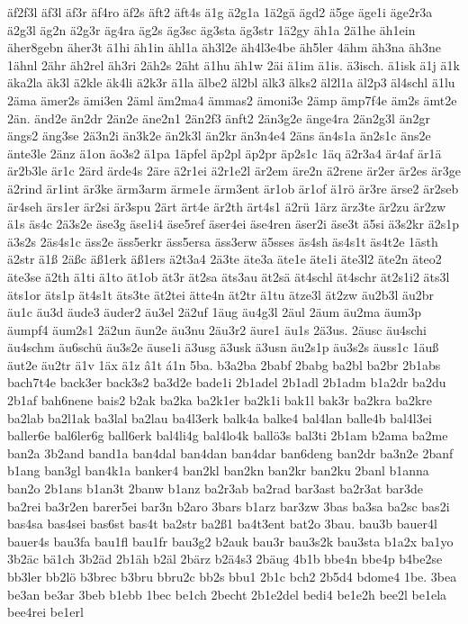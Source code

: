 {äf2f3l
äf3l
äf3r
äf4ro
äf2s
äft2
äft4s
ä1g
ä2g1a
1ä2gä
ägd2
ä5ge
äge1i
äge2r3a
ä2g3l
äg2n
ä2g3r
äg4ra
äg2s
äg3sc
äg3sta
äg3str
1ä2gy
äh1a
2ä1he
äh1ein
äher8gebn
äher3t
ä1hi
äh1in
ähl1a
äh3l2e
äh4l3e4be
äh5ler
4ähm
äh3na
äh3ne
1ähnl
2ähr
äh2rel
äh3ri
2äh2s
2äht
ä1hu
äh1w
2äi
ä1im
ä1is.
ä3isch.
ä1isk
ä1j
ä1k
äka2la
äk3l
ä2kle
äk4li
ä2k3r
ä1la
älbe2
äl2bl
älk3
älks2
äl2l1a
äl2p3
äl4schl
ä1lu
2äma
ämer2s
ämi3en
2äml
äm2ma4
ämmas2
ämoni3e
2ämp
ämp7f4e
äm2s
ämt2e
2än.
änd2e
än2dr
2än2e
äne2n1
2än2f3
änft2
2än3g2e
änge4ra
2än2g3l
än2gr
ängs2
äng3se
2ä3n2i
än3k2e
än2k3l
än2kr
än3n4e4
2äns
än4s1a
än2s1c
äns2e
änte3le
2änz
ä1on
äo3s2
ä1pa
1äpfel
äp2pl
äp2pr
äp2s1c
1äq
ä2r3a4
är4af
är1ä
är2b3le
är1c
2ärd
ärde4s
2äre
ä2r1ei
ä2r1e2l
är2em
äre2n
ä2rene
är2er
är2es
är3ge
ä2rind
är1int
är3ke
ärm3arm
ärme1e
ärm3ent
är1ob
är1of
ä1rö
är3re
ärse2
är2seb
är4seh
ärs1er
är2si
är3spu
2ärt
ärt4e
är2th
ärt4s1
ä2rü
1ärz
ärz3te
är2zu
är2zw
ä1s
äs4c
2ä3s2e
äse3g
äse1i4
äse5ref
äser4ei
äse4ren
äser2i
äse3t
ä5si
ä3s2kr
ä2s1p
ä3s2s
2äs4s1c
äss2e
äss5erkr
äss5ersa
äss3erw
ä5sses
äs4sh
äs4s1t
äs4t2e
1ästh
ä2str
ä1ß
2äßc
äß1erk
äß1ers
ä2t3a4
2ä3te
äte3a
äte1e
äte1i
äte3l2
äte2n
äteo2
äte3se
ä2th
ä1ti
ä1to
ät1ob
ät3r
ät2sa
äts3au
ät2sä
ät4schl
ät4schr
ät2s1i2
äts3l
äts1or
äts1p
ät4s1t
äts3te
ät2tei
ätte4n
ät2tr
ä1tu
ätze3l
ät2zw
äu2b3l
äu2br
äu1c
äu3d
äude3
äuder2
äu3el
2ä2uf
1äug
äu4g3l
2äul
2äum
äu2ma
äum3p
äumpf4
äum2s1
2ä2un
äun2e
äu3nu
2äu3r2
äure1
äu1s
2ä3us.
2äusc
äu4schi
äu4schm
äu6schü
äu3s2e
äuse1i
ä3usg
ä3usk
ä3usn
äu2s1p
äu3s2s
äuss1c
1äuß
äut2e
äu2tr
ä1v
1äx
ä1z
â1t
á1n
5ba.
b3a2ba
2babf
2babg
ba2bl
ba2br
2b1abs
bach7t4e
back3er
back3s2
ba3d2e
bade1i
2b1adel
2b1adl
2b1adm
b1a2dr
ba2du
2b1af
bah6nene
bais2
b2ak
ba2ka
ba2k1er
ba2k1i
bak1l
bak3r
ba2kra
ba2kre
ba2lab
ba2l1ak
ba3lal
ba2lau
ba4l3erk
balk4a
balke4
bal4lan
balle4b
bal4l3ei
baller6e
bal6ler6g
ball6erk
bal4li4g
bal4lo4k
ballö3s
bal3ti
2b1am
b2ama
ba2me
ban2a
3b2and
band1a
ban4dal
ban4dan
ban4dar
ban6deng
ban2dr
ba3n2e
2banf
b1ang
ban3gl
ban4k1a
banker4
ban2kl
ban2kn
ban2kr
ban2ku
2banl
b1anna
ban2o
2b1ans
b1an3t
2banw
b1anz
ba2r3ab
ba2rad
bar3ast
ba2r3at
bar3de
ba2rei
ba3r2en
barer5ei
bar3n
b2aro
3bars
b1arz
bar3zw
3bas
ba3sa
ba2sc
bas2i
bas4sa
bas4sei
bas6st
bas4t
ba2str
ba2ß1
ba4t3ent
bat2o
3bau.
bau3b
bauer4l
bauer4s
bau3fa
bau1fl
bau1fr
bau3g2
b2auk
bau3r
bau3s2k
bau3sta
b1a2x
ba1yo
3b2äc
bä1ch
3b2äd
2b1äh
b2äl
2bärz
b2ä4s3
2bäug
4b1b
bbe4n
bbe4p
b4be2se
bb3ler
bb2lö
b3brec
b3bru
bbru2c
bb2s
bbu1
2b1c
bch2
2b5d4
bdome4
1be.
3bea
be3an
be3ar
3beb
b1ebb
1bec
be1ch
2becht
2b1e2del
bedi4
be1e2h
bee2l
be1ela
bee4rei
be1erl
}

